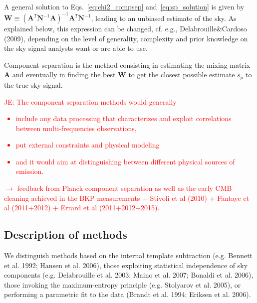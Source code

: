 A general solution to Eqs.~\ref{eq:chi2_compsep} and~\ref{eq:sp_solution} is given by $\mathbf{W} \equiv \left( \mathbf{A}^T\mathbf{N}^{-1}\mathbf{A} \right)^{-1}\mathbf{A}^T\mathbf{N}^{-1}$, leading to an unbiased estimate of the sky. As explained below, this expression can be changed, cf. e.g., Delabrouille\&Cardoso (2009), depending on the level of generality, complexity and prior knowledge on the sky signal analysts want or are able to use.

Component separation is the method consisting in estimating the mixing matrix $\mathbf{A}$ and eventually in finding the best $\mathbf{W}$ to get the closest possible estimate $\tilde{s}_p$ to the true sky signal.


\textcolor{red}{JE: The component separation methods would generally
\begin{itemize}
	\item include any data processing that characterizes and exploit correlations between multi-frequencies observations,
	\item put external constraints and physical modeling
	\item and it would aim at distinguishing between different physical sources of emission.
\end{itemize}
$\rightarrow$ feedback from Planck component separation as well as the early CMB cleaning achieved in the BKP measurements + Stivoli et al (2010) + Fantaye et al (2011+2012) + Errard et al (2011+2012+2015).}

\subsection{Description of methods}

We distinguish methods based on the internal template subtraction (e.g. Bennett et al. 1992; Hansen et al. 2006), those exploiting statistical independence of sky components (e.g. Delabrouille et al. 2003; Maino et al. 2007; Bonaldi et al. 2006), those invoking the maximum-entropy principle (e.g. Stolyarov et al. 2005), or performing a parametric fit to the data (Brandt et al. 1994; Eriksen et al. 2006).

